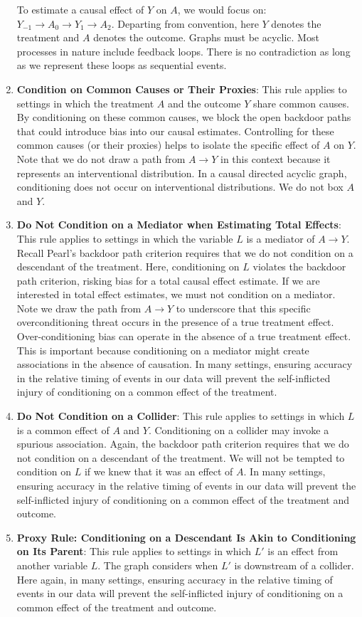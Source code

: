 \documentclass[
  single column]{article}
\begin{document}
\begin{enumerate}
  To estimate a causal effect of \(Y\) on \(A\), we would focus on:
  \(\boxed{Y_{-1}} \to \boxed{A_0} \to Y_1 \rightarrow A_2\). Departing
  from convention, here \(Y\) denotes the treatment and \(A\) denotes
  the outcome. Graphs must be acyclic. Most processes in nature include
  feedback loops. There is no contradiction as long as we represent
  these loops as sequential events.
\item
  \textbf{Condition on Common Causes or Their Proxies}: This rule
  applies to settings in which the treatment \(A\) and the outcome \(Y\)
  share common causes. By conditioning on these common causes, we block
  the open backdoor paths that could introduce bias into our causal
  estimates. Controlling for these common causes (or their proxies)
  helps to isolate the specific effect of \(A\) on \(Y\). Note that we
  do not draw a path from \(A \to Y\) in this context because it
  represents an interventional distribution. In a causal directed
  acyclic graph, conditioning does not occur on interventional
  distributions. We do not box \(A\) and \(Y\).
\item
  \textbf{Do Not Condition on a Mediator when Estimating Total Effects}:
  This rule applies to settings in which the variable \(L\) is a
  mediator of \(A \to Y\). Recall Pearl's backdoor path criterion
  requires that we do not condition on a descendant of the treatment.
  Here, conditioning on \(L\) violates the backdoor path criterion,
  risking bias for a total causal effect estimate. If we are interested
  in total effect estimates, we must not condition on a mediator. Note
  we draw the path from \(A \to Y\) to underscore that this specific
  overconditioning threat occurs in the presence of a true treatment
  effect. Over-conditioning bias can operate in the absence of a true
  treatment effect. This is important because conditioning on a mediator
  might create associations in the absence of causation. In many
  settings, ensuring accuracy in the relative timing of events in our
  data will prevent the self-inflicted injury of conditioning on a
  common effect of the treatment.
\item
  \textbf{Do Not Condition on a Collider}: This rule applies to settings
  in which \(L\) is a common effect of \(A\) and \(Y\). Conditioning on
  a collider may invoke a spurious association. Again, the backdoor path
  criterion requires that we do not condition on a descendant of the
  treatment. We will not be tempted to condition on \(L\) if we knew
  that it was an effect of \(A\). In many settings, ensuring accuracy in
  the relative timing of events in our data will prevent the
  self-inflicted injury of conditioning on a common effect of the
  treatment and outcome.
\item
  \textbf{Proxy Rule: Conditioning on a Descendant Is Akin to
  Conditioning on Its Parent}: This rule applies to settings in which
  \(L'\) is an effect from another variable \(L\). The graph considers
  when \(L'\) is downstream of a collider. Here again, in many settings,
  ensuring accuracy in the relative timing of events in our data will
  prevent the self-inflicted injury of conditioning on a common effect
  of the treatment and outcome.
\end{enumerate}
\end{document}
